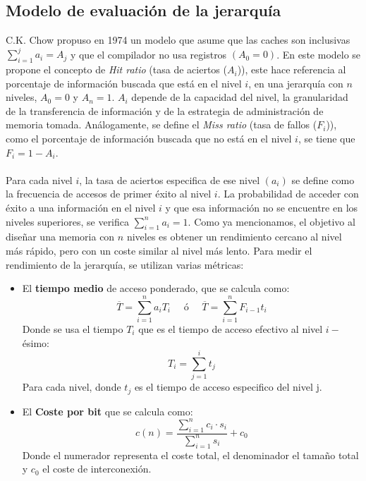 \subsection{Modelo de evaluación de la jerarquía}
C.K. Chow propuso en 1974 un modelo que asume que las caches son inclusivas $\sum_{i=1}^{j} a_i = A_j$ y que el compilador no usa registros $(A_0 = 0)$.
En este modelo se propone el concepto de \textit{Hit ratio} (tasa de aciertos ($A_i$)), este hace referencia al porcentaje de información buscada
que está en el nivel $i$, en una jerarquía con $n$ niveles, $A_0 = 0$ y $A_n = 1$. $A_i$ depende de la capacidad del nivel, la granularidad de la transferencia de información
y de la estrategia de administración de memoria tomada.
Análogamente, se define el \textit{Miss ratio} (tasa de fallos ($F_i$)), como el porcentaje de información buscada que no está en el nivel $i$, se tiene que $F_i = 1 - A_i$.
\\ \\
Para cada nivel $i$, la tasa de aciertos especifica de ese nivel $(a_i)$ se define como la frecuencia de accesos de primer éxito al nivel $i$. La probabilidad de 
acceder con éxito a una información en el nivel $i$ y que esa información no se encuentre en los niveles superiores, se verifica $\sum_{i=1}^{n} a_i = 1$.
Como ya mencionamos, el objetivo al diseñar una memoria con $n$ niveles es obtener un rendimiento cercano al nivel más rápido, pero con un coste similar al nivel más lento.
Para medir el rendimiento de la jerarquía, se utilizan varias métricas:
\begin{itemize}
    \item El \textbf{tiempo medio} de acceso ponderado, que se calcula como:
        \begin{equation*}
            \overline{T} = \sum_{i=1}^n a_i T_i \quad \text{ ó }\quad \overline{T} = \sum_{i=1}^n F_{i-1} t_i 
        \end{equation*}
Donde se usa el tiempo $T_i$ que es el tiempo de acceso efectivo al nivel $i-$ésimo:
\begin{equation*}
    T_i = \sum_{j=1}^{i} t_j 
\end{equation*}
Para cada nivel, donde $t_j$ es el tiempo de acceso especifico del nivel j.
    \item El \textbf{Coste por bit} que se calcula como:
\begin{equation*}
    c(n) = \frac{\sum_{i=1}^{n} c_i \cdot s_i}{\sum_{i=1}^{n} s_i} + c_0
\end{equation*}
Donde el numerador representa el coste total, el denominador el tamaño total y $c_0$ el coste de interconexión.
\end{itemize}
